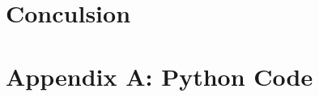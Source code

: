 \documentclass[twocolumn,10pt]{asme2ej}
\begin{document}
\section{Conculsion}

\clearpage
\onecolumn
\appendix       %
\section*{Appendix A: Python Code}



\end{document}
